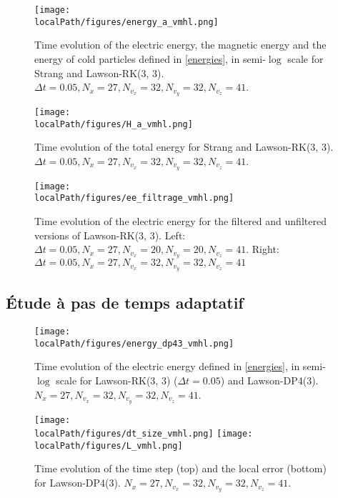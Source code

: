 \begin{figure}[h]
  \centering
  \texttt{[image: \\localPath/figures/energy\_a\_vmhl.png]}
  \caption{Time evolution of the electric energy, the magnetic energy and the energy of cold particles defined in \eqref{energies}, in semi-$\log$ scale for Strang and Lawson-RK(3, 3). $\Delta t = 0.05, N_x=27, N_{v_x}=32, N_{v_y}=32, N_{v_z}=41$.}
  \label{fig:energies4d}
\end{figure}

\begin{figure}[h]
  \centering
  \texttt{[image: \\localPath/figures/H\_a\_vmhl.png]}
  \caption{Time evolution of the total energy for Strang and Lawson-RK(3, 3). $\Delta t = 0.05, N_x=27, N_{v_x}=32, N_{v_y}=32, N_{v_z}=41$.}
  \label{fig:energy_tot4d}
\end{figure}

\begin{figure}[h]
  \centering
  \texttt{[image: \\localPath/figures/ee\_filtrage\_vmhl.png]}
  \caption{Time evolution of the electric energy for the filtered and unfiltered versions of Lawson-RK(3, 3). Left: $\Delta t = 0.05, N_x=27, N_{v_x}=20, N_{v_y}=20, N_{v_z}=41$. Right: $\Delta t = 0.05, N_x=27, N_{v_x}=32, N_{v_y}=32, N_{v_z}=41$}
  \label{fig:compar_ee4d}
\end{figure}



\subsection{Étude à pas de temps adaptatif}

\begin{figure}[h]
  \centering
  \texttt{[image: \\localPath/figures/energy\_dp43\_vmhl.png]}
  \caption{Time evolution of the electric energy defined in \eqref{energies}, in semi-$\log$ scale for Lawson-RK(3, 3) ($\Delta t=0.05$) and Lawson-DP4(3). $N_x=27, N_{v_x}=32, N_{v_y}=32, N_{v_z}=41$.}
  \label{fig:energieselecdp43}
\end{figure}

\begin{figure}[h]
  \centering
  \texttt{[image: \\localPath/figures/dt\_size\_vmhl.png]}
  \texttt{[image: \\localPath/figures/L\_vmhl.png]}
  \caption{Time evolution of the time step (top) and the local error (bottom) for Lawson-DP4(3). $N_x=27, N_{v_x}=32, N_{v_y}=32, N_{v_z}=41$.}
  \label{fig:dtanderrordp43}
\end{figure}

